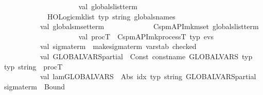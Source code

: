 \begin{isabellebody}
\ \ \ \ \ \ \ \ \ \ \isanewline
\ \ \ \ \ \ \ \ \ \ val\ globals{\isacharunderscore}{\kern0pt}list{\isacharunderscore}{\kern0pt}term\ {\isacharequal}{\kern0pt}\isanewline
\ \ \ \ \ \ \ \ \ \ \ \ HOLogic{\isachardot}{\kern0pt}mk{\isacharunderscore}{\kern0pt}list\ {\isacharat}{\kern0pt}{\isacharbraceleft}{\kern0pt}typ\ string{\isacharbraceright}{\kern0pt}\ globals{\isacharunderscore}{\kern0pt}names\isanewline
\ \ \ \ \ \ \ \ \ \ \isanewline
\ \ \ \ \ \ \ \ \ \ val\ globals{\isacharunderscore}{\kern0pt}mset{\isacharunderscore}{\kern0pt}term\ {\isacharequal}{\kern0pt}\isanewline
\ \ \ \ \ \ \ \ \ \ \ \ Cspm{\isacharunderscore}{\kern0pt}API{\isachardot}{\kern0pt}mk{\isacharunderscore}{\kern0pt}mset\ globals{\isacharunderscore}{\kern0pt}list{\isacharunderscore}{\kern0pt}term\isanewline
\ \ \ \ \ \ \ \ \ \ \isanewline
\ \ \ \ \ \ \ \ \ \ val\ procT\ {\isacharequal}{\kern0pt}\ Cspm{\isacharunderscore}{\kern0pt}API{\isachardot}{\kern0pt}mk{\isacharunderscore}{\kern0pt}processT\ {\isacharat}{\kern0pt}{\isacharbraceleft}{\kern0pt}typ\ evs{\isacharbraceright}{\kern0pt}\isanewline
\ \ \ \ \ \ \ \ \ \ val\ sigma{}{\isacharunderscore}{\kern0pt}term\ {\isacharequal}{\kern0pt}\ make{\isacharunderscore}{\kern0pt}sigma{\isacharunderscore}{\kern0pt}term\ {\isacharparenleft}{\kern0pt}{\isacharhash}{\kern0pt}varstab\ checked{\isacharparenright}{\kern0pt}\isanewline
\ \ \ \ \ \ \ \ \ \ \isanewline
\ \ \ \ \ \ \ \ \ \ val\ GLOBALVARS{\isacharunderscore}{\kern0pt}partial\ {\isacharequal}{\kern0pt}\ Const\ {\isacharparenleft}{\kern0pt}{\isacharat}{\kern0pt}{\isacharbraceleft}{\kern0pt}const{\isacharunderscore}{\kern0pt}name\ GLOBALVARS{\isacharbraceright}{\kern0pt}{\isacharcomma}{\kern0pt}\ {\isacharat}{\kern0pt}{\isacharbraceleft}{\kern0pt}typ\ {\isasymsigma}{\isacharbraceright}{\kern0pt}\ {\isacharminus}{\kern0pt}{\isacharminus}{\kern0pt}{\isachargreater}{\kern0pt}\ {\isacharat}{\kern0pt}{\isacharbraceleft}{\kern0pt}typ\ string{\isacharbraceright}{\kern0pt}\ {\isacharminus}{\kern0pt}{\isacharminus}{\kern0pt}{\isachargreater}{\kern0pt}\ procT{\isacharparenright}{\kern0pt}\isanewline
\ \ \ \ \ \ \ \ \ \ val\ lam{\isacharunderscore}{\kern0pt}GLOBALVARS\ {\isacharequal}{\kern0pt}\ Abs\ {\isacharparenleft}{\kern0pt}{\isachardoublequote}{\kern0pt}idx{\isachardoublequote}{\kern0pt}{\isacharcomma}{\kern0pt}\ {\isacharat}{\kern0pt}{\isacharbraceleft}{\kern0pt}typ\ string{\isacharbraceright}{\kern0pt}{\isacharcomma}{\kern0pt}\ GLOBALVARS{\isacharunderscore}{\kern0pt}partial\ {\isachardollar}{\kern0pt}\ sigma{}{\isacharunderscore}{\kern0pt}term\ {\isachardollar}{\kern0pt}\ Bound\ {}{\isacharparenright}{\kern0pt}\isanewline

\end{isabellebody}
